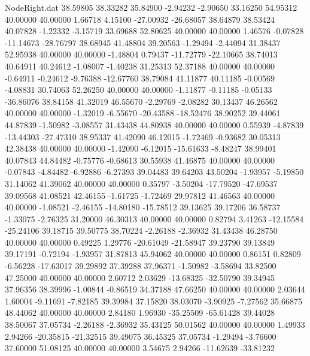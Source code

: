\begin{filecontents}{NodeRight.dat}
  38.59805   38.33282   35.84900    -2.94232   -2.90650   33.16250   54.95312   40.00000   40.00000    1.66718    4.15100  -27.00932  -26.68057
  38.64879   38.53424   40.07828    -1.22332   -3.15719   33.69688   52.80625   40.00000   40.00000    1.46576   -0.07828  -11.14673  -28.76797
  38.68945   41.48804   39.20563    -1.29494   -2.44094   31.38437   52.95938   40.00000   40.00000   -1.48804    0.79437  -11.72779  -22.10665
  38.74013   40.64911   40.24612    -1.08007   -1.40238   31.25313   52.37188   40.00000   40.00000   -0.64911   -0.24612   -9.76388  -12.67760
  38.79084   41.11877   40.11185    -0.00569   -4.08831   30.74063   52.26250   40.00000   40.00000   -1.11877   -0.11185   -0.05133  -36.86076
  38.84158   41.32019   46.55670    -2.29769   -2.08282   30.13437   46.26562   40.00000   40.00000   -1.32019   -6.55670  -20.43588  -18.52476
  38.90252   39.44061   44.87839    -1.50982   -3.08557   31.43438   44.80938   40.00000   40.00000    0.55939   -4.87839  -13.44303  -27.47310
  38.95337   41.42090   46.12015    -1.72469   -0.93682   30.05313   42.38438   40.00000   40.00000   -1.42090   -6.12015  -15.61633   -8.48247
  38.99401   40.07843   44.84482    -0.75776   -0.68613   30.55938   41.46875   40.00000   40.00000   -0.07843   -4.84482   -6.92886   -6.27393
  39.04483   39.64203   43.50204    -1.93957   -5.19850   31.14062   41.39062   40.00000   40.00000    0.35797   -3.50204  -17.79520  -47.69537
  39.09568   41.08521   42.46155    -1.61725   -1.72469   29.97812   41.46563   40.00000   40.00000   -1.08521   -2.46155  -14.80180  -15.78512
  39.13625   39.17206   36.58737    -1.33075   -2.76325   31.20000   46.30313   40.00000   40.00000    0.82794    3.41263  -12.15584  -25.24106
  39.18715   39.50775   38.70224    -2.26188   -2.36932   31.43438   46.28750   40.00000   40.00000    0.49225    1.29776  -20.61049  -21.58947
  39.23790   39.13849   39.17191    -0.72194   -1.93957   31.87813   45.94062   40.00000   40.00000    0.86151    0.82809   -6.56228  -17.63017
  39.29892   37.39288   37.96371    -1.50982   -3.58694   33.82500   47.25000   40.00000   40.00000    2.60712    2.03629  -13.68325  -32.50790
  39.34945   37.96356   38.39996    -1.00844   -0.86519   34.37188   47.66250   40.00000   40.00000    2.03644    1.60004   -9.11691   -7.82185
  39.39984   37.15820   38.03070    -3.90925   -7.27562   35.66875   48.44062   40.00000   40.00000    2.84180    1.96930  -35.25509  -65.61428
  39.44028   38.50067   37.05734    -2.26188   -2.36932   35.43125   50.01562   40.00000   40.00000    1.49933    2.94266  -20.35815  -21.32515
  39.49075   36.45325   37.05734    -1.29494   -3.76600   37.60000   51.08125   40.00000   40.00000    3.54675    2.94266  -11.62639  -33.81232

\end{filecontents}
